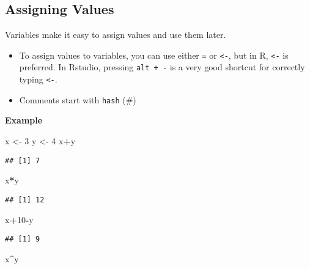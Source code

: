 \documentclass[
]{book}
\newenvironment{Shaded}{\begin{snugshade}}{\end{snugshade}}
\newcommand{\DecValTok}[1]{\textcolor[rgb]{0.00,0.00,0.81}{#1}}
\newcommand{\NormalTok}[1]{#1}
\newcommand{\OperatorTok}[1]{\textcolor[rgb]{0.81,0.36,0.00}{\textbf{#1}}}
\newcommand{\StringTok}[1]{\textcolor[rgb]{0.31,0.60,0.02}{#1}}
\providecommand{\tightlist}{%
  \setlength{\itemsep}{0pt}\setlength{\parskip}{0pt}}
\begin{document}
\hypertarget{assigning-values}{%
\subsection{Assigning Values}\label{assigning-values}}

Variables make it easy to assign values and use them later.

\begin{itemize}
\tightlist
\item
  To assign values to variables, you can use either \texttt{=} or \texttt{\textless{}-}, but in R, \texttt{\textless{}-} is preferred. In Rstudio, pressing \texttt{alt\ +\ -} is a very good shortcut for correctly typing \texttt{\textless{}-}.
\item
  Comments start with \texttt{hash} (\#)
\end{itemize}

\textbf{Example}

\begin{Shaded}
\begin{Highlighting}[]
\NormalTok{x <-}\StringTok{  }\DecValTok{3}
\NormalTok{y <-}\StringTok{  }\DecValTok{4}
\NormalTok{x}\OperatorTok{+}\NormalTok{y}
\end{Highlighting}
\end{Shaded}

\begin{verbatim}
## [1] 7
\end{verbatim}

\begin{Shaded}
\begin{Highlighting}[]
\NormalTok{x}\OperatorTok{*}\NormalTok{y}
\end{Highlighting}
\end{Shaded}

\begin{verbatim}
## [1] 12
\end{verbatim}

\begin{Shaded}
\begin{Highlighting}[]
\NormalTok{x}\OperatorTok{+}\DecValTok{10}\OperatorTok{-}\NormalTok{y}
\end{Highlighting}
\end{Shaded}

\begin{verbatim}
## [1] 9
\end{verbatim}

\begin{Shaded}
\begin{Highlighting}[]
\NormalTok{x}\OperatorTok{^}\NormalTok{y}
\end{Highlighting}
\end{Shaded}
\end{document}
